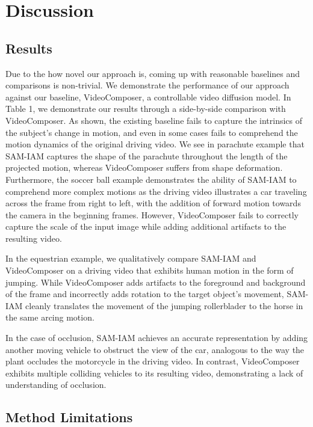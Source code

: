 \section{Discussion}

\subsection{Results}
Due to the how novel our approach is, coming up with reasonable baselines and comparisons is non-trivial. We demonstrate the performance of our approach against our baseline, VideoComposer, a controllable video diffusion model. In Table 1, we demonstrate our results through a side-by-side comparison with VideoComposer. As shown, the existing baseline fails to capture the intrinsics of the subject's change in motion, and even in some cases fails to comprehend the motion dynamics of the original driving video. We see in parachute example that SAM-IAM captures the shape of the parachute throughout the length of the projected motion, whereas VideoComposer suffers from shape deformation. Furthermore, the soccer ball example demonstrates the ability of SAM-IAM to comprehend more complex motions as the driving video illustrates a car traveling across the frame from right to left, with the addition of forward motion towards the camera in the beginning frames. However, VideoComposer fails to correctly capture the scale of the input image while adding additional artifacts to the resulting video.

In the equestrian example, we qualitatively compare SAM-IAM and VideoComposer on a driving video that exhibits human motion in the form of jumping. While VideoComposer adds artifacts to the foreground and background of the frame and incorrectly adds rotation to the target object's movement, SAM-IAM cleanly translates the movement of the jumping rollerblader to the horse in the same arcing motion.

In the case of occlusion, SAM-IAM achieves an accurate representation by adding another moving vehicle to obstruct the view of the car, analogous to the way the plant occludes the motorcycle in the driving video. In contrast, VideoComposer exhibits multiple colliding vehicles to its resulting video, demonstrating a lack of understanding of occlusion.

\subsection{Method Limitations}

